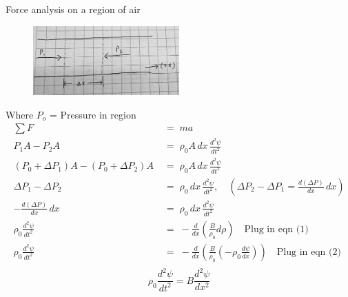 \documentclass[12pt]{article}
\begin{document}
\begin{enumerate}
\begin{itemize}
\vspace{1em} Force analysis on a region of air
\begin{figure}[H]
    \centering
    \includegraphics[width=0.5\textwidth]{Sound 2.JPG}
\end{figure}
Where $P_o$ = Pressure in region
\begin{align*}
\sum F \;&=\; m a \\
P_1 A - P_2 A \;&=\; \rho_0 A \, dx \, \frac{d^2 \psi}{dt^2} \\
(P_0 + \Delta P_1) A - (P_0 + \Delta P_2) A \;&=\; \rho_0 A \, dx \, \frac{d^2 \psi}{dt^2} \\
\Delta P_1 - \Delta P_2 \;&=\; \rho_0 \, dx \, \frac{d^2 \psi}{dt^2}, \quad 
\left( \Delta P_2 - \Delta P_1 = \frac{d (\Delta P)}{dx} \, dx \right) \\
- \frac{d (\Delta P)}{dx} \, dx \;&=\; \rho_0 \, dx \, \frac{d^2 \psi}{dt^2} \\
\rho_0 \frac{d^2 \psi}{dt^2} \;&=\; - \frac{d}{dx} \left( \frac{B}{\rho_0} d \rho \right) \quad \text{Plug in eqn (1)} \\
\rho_0 \frac{d^2 \psi}{dt^2} \;&=\; - \frac{d}{dx} \left( \frac{B}{\rho_0} \left(-\rho_0 \frac{d\psi}{dx} \right) \right) \quad \text{Plug in eqn (2)} \\
\end{align*}
\[\boxed{\rho_0 \frac{d^2 \psi}{dt^2} = B \frac{d^2 \psi}{dx^2}}\]
\end{itemize}


\end{enumerate}
\end{document}
